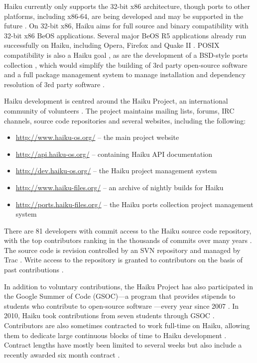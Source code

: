 \documentclass{article}
\begin{document}
Haiku currently only supports the 32-bit x86 architecture, though
ports to other platforms, including x86-64, are being developed and
may be supported in the future \cite{HaikuFaq}.  On 32-bit x86, Haiku
aims for full source and binary compatibility with 32-bit x86 BeOS
applications.  Several major BeOS R5 applications already run
successfully on Haiku, including Opera, Firefox and Quake II
\cite{HaikuWiki}.  POSIX compatibility is also a Haiku goal
\cite{HaikuFuture, HaikuIncContracts}, as are the development of a
BSD-style ports collection \cite{HaikuPorts}, which would simplify the
building of 3rd party open-source software and a full package
management system to manage installation and dependency resolution of
3rd party software \cite{HaikuR1A3Notes}.

Haiku development is centred around the Haiku Project, an
international community of volunteers \cite{HaikuAbout}.  The project
maintains mailing lists, forums, IRC channels, \cite{HaikuComm} source
code repositories \cite{HaikuGetSvn} and several websites, including
the following:
\begin{itemize}
  \item \url{http://www.haiku-os.org/} -- the main project website
  \item \url{http://api.haiku-os.org/} -- containing Haiku API documentation
  \item \url{http://dev.haiku-os.org/} -- the Haiku project management
    system
  \item \url{http://www.haiku-files.org/} -- an archive of nightly
    builds for Haiku
  \item \url{http://ports.haiku-files.org/} -- the Haiku ports collection
    project management system
\end{itemize}

There are 81 developers with commit access to the Haiku source code
repository, with the top contributors ranking in the thousands of
commits over many years \cite{HaikuContrib}.  The source code is
revision controlled by an SVN repository and managed by Trac
\cite{HaikuDevStart}.  Write access to the repository is granted to
contributors on the basis of past contributions \cite{HaikuDevStart}.

In addition to voluntary contributions, the Haiku Project has also
participated in the Google Summer of Code (GSOC)---a program that
provides stipends to students who contribute to open-source software
\cite{GSOCWiki}---every year since 2007 \cite{HaikuGSOC}.  In 2010,
Haiku took contributions from seven students through GSOC
\cite{HaikuGSOC2010}.  Contributors are also sometimes contracted to
work full-time on Haiku, allowing them to dedicate large continuous
blocks of time to Haiku development \cite{HaikuIncContracts}.
Contract lengths have mostly been limited to several weeks but also
include a recently awarded six month contract
\cite{HaikuLongContract}.
\end{document}
